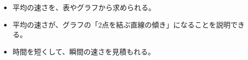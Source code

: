 
\begin{goal}
\begin{itemize}[label={\color{bkTheme}●}, leftmargin=1.6\zw, itemsep=0pt, topsep=1pt]
\item {}\enspace 平均の速さを、表やグラフから求められる。
\item {}\enspace 平均の速さが、グラフの「2点を結ぶ直線の傾き」になることを説明できる。
\item {}\enspace 時間を短くして、瞬間の速さを見積もれる。
\end{itemize}
\end{goal}

